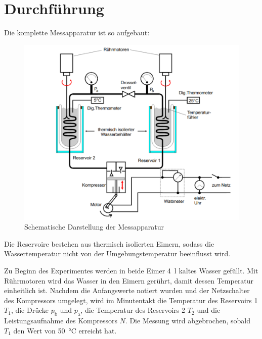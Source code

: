 \section{Durchführung}
\label{sec:Durchführung}
Die komplette Messapparatur ist so aufgebaut:
\begin{figure}
\centering
\includegraphics[width=\textwidth]{Darstellung_Waermepumpe.pdf}
\caption{Schematische Darstellung der Messapparatur \cite{sample}}
\end{figure}
Die Reservoire bestehen aus thermisch isolierten Eimern, sodass die Wassertemperatur nicht von der Umgebungstemperatur beeinflusst wird.

Zu Beginn des Experimentes werden in beide Eimer \SI{4}{\litre} kaltes Wasser gefüllt. 
Mit Rührmotoren wird das Wasser in den Eimern gerührt, damit dessen Temperatur einheitlich ist.
Nachdem die Anfangswerte notiert wurden und der Netzschalter des Kompressors umgelegt, wird im Minutentakt die Temperatur des Reservoirs 1 $T_{1}$, die Drücke $p_{\text{b}}$ und $p_{\text{a}}$, die Temperatur des Reservoirs 2 $T_{2}$ und die Leistungsaufnahme des Kompressors $N$.
Die Messung wird abgebrochen, sobald $T_1$ den Wert von \SI{50}{\celsius} erreicht hat.

